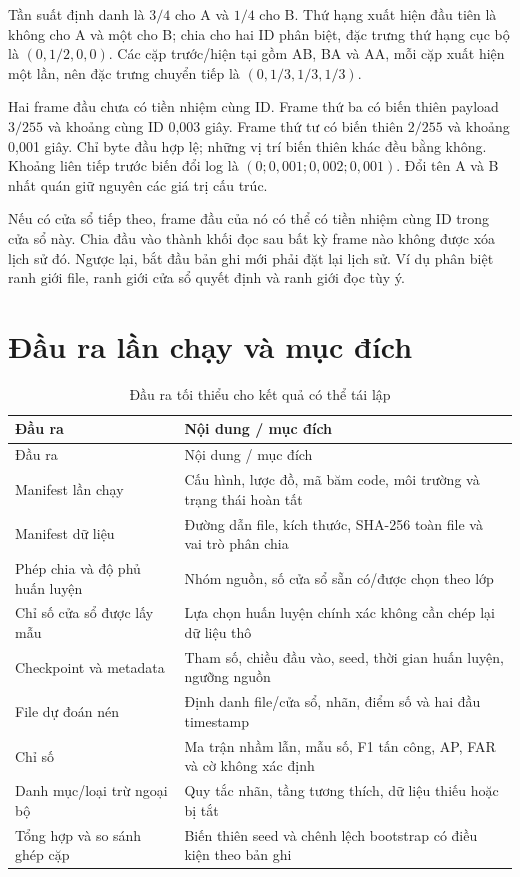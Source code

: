 \documentclass[12pt,a4paper,oneside,openany]{extbook}
\begin{document}
Tần suất định danh là $3/4$ cho A và $1/4$ cho B. Thứ hạng xuất hiện đầu tiên là không cho A và một cho B; chia cho hai ID phân biệt, đặc trưng thứ hạng cục bộ là $(0,1/2,0,0)$. Các cặp trước/hiện tại gồm AB, BA và AA, mỗi cặp xuất hiện một lần, nên đặc trưng chuyển tiếp là $(0,1/3,1/3,1/3)$.

Hai frame đầu chưa có tiền nhiệm cùng ID. Frame thứ ba có biến thiên payload $3/255$ và khoảng cùng ID 0,003 giây. Frame thứ tư có biến thiên $2/255$ và khoảng 0,001 giây. Chỉ byte đầu hợp lệ; những vị trí biến thiên khác đều bằng không. Khoảng liên tiếp trước biến đổi log là $(0;0{,}001;0{,}002;0{,}001)$. Đổi tên A và B nhất quán giữ nguyên các giá trị cấu trúc.

Nếu có cửa sổ tiếp theo, frame đầu của nó có thể có tiền nhiệm cùng ID trong cửa sổ này. Chia đầu vào thành khối đọc sau bất kỳ frame nào không được xóa lịch sử đó. Ngược lại, bắt đầu bản ghi mới phải đặt lại lịch sử. Ví dụ phân biệt ranh giới file, ranh giới cửa sổ quyết định và ranh giới đọc tùy ý.

\section{Đầu ra lần chạy và mục đích}
\begin{longtable}{P{4.7cm}P{8.2cm}}
\caption{Đầu ra tối thiểu cho kết quả có thể tái lập}\label{tab:artifacts}\\\toprule
Đầu ra & Nội dung / mục đích\\\midrule\endfirsthead\toprule Đầu ra & Nội dung / mục đích\\\midrule\endhead
Manifest lần chạy & Cấu hình, lược đồ, mã băm code, môi trường và trạng thái hoàn tất\\
Manifest dữ liệu & Đường dẫn file, kích thước, SHA-256 toàn file và vai trò phân chia\\
Phép chia và độ phủ huấn luyện & Nhóm nguồn, số cửa sổ sẵn có/được chọn theo lớp\\
Chỉ số cửa sổ được lấy mẫu & Lựa chọn huấn luyện chính xác không cần chép lại dữ liệu thô\\
Checkpoint và metadata & Tham số, chiều đầu vào, seed, thời gian huấn luyện, ngưỡng nguồn\\
File dự đoán nén & Định danh file/cửa sổ, nhãn, điểm số và hai đầu timestamp\\
Chỉ số & Ma trận nhầm lẫn, mẫu số, F1 tấn công, AP, FAR và cờ không xác định\\
Danh mục/loại trừ ngoại bộ & Quy tắc nhãn, tầng tương thích, dữ liệu thiếu hoặc bị tắt\\
Tổng hợp và so sánh ghép cặp & Biến thiên seed và chênh lệch bootstrap có điều kiện theo bản ghi\\\bottomrule
\end{longtable}
\end{document}
